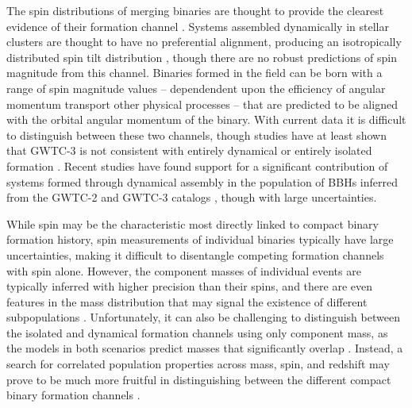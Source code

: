 The spin distributions of merging binaries are thought to provide the clearest evidence of their formation channel \citep{10.1088/1361-6382/aa552e, 10.1093/mnras/stx1764, 2017Natur.548..426F,2018ApJ...854L...9F}. Systems assembled dynamically in stellar clusters are thought to have no preferential alignment, producing an isotropically distributed spin tilt distribution \citep{1609.05916,10.1103/PhysRevD.100.043027}, though there are no robust predictions of spin magnitude from this channel. Binaries formed in the field can be born with a range of spin magnitude values -- dependendent upon the efficiency of angular momentum transport other physical processes -- that are predicted to be aligned with the orbital angular momentum of the binary. With current data it is difficult to distinguish between these two channels, though studies have at least shown that GWTC-3 is not consistent with entirely dynamical or entirely isolated formation \citep{2021arXiv211103634T,2022ApJ...937L..13C,2022arXiv220902206T,2022arXiv221012834E,10.3847/2041-8213/ac86c4,2011.09570}. Recent studies have found support for a significant contribution of systems formed through dynamical assembly in the population of BBHs inferred from the GWTC-2 and GWTC-3 catalogs \citep{2021ApJ...913L...7A,2021PhRvD.104h3010R,2021arXiv211103634T,2022ApJ...937L..13C,2021ApJ...921L..15G,2022arXiv220902206T,2022arXiv220906978V,2022arXiv221012834E}, though with large uncertainties.

While spin may be the characteristic most directly linked to compact binary formation history, spin measurements of individual binaries typically have large uncertainties, making it difficult to disentangle competing formation channels with spin alone. However, the component masses of individual events are typically inferred with higher precision than their spins, and there are even features in the mass distribution that may signal the existence of different subpopulations \citep{2021ApJ...913L..19T,2022ApJ...924..101E,2021arXiv211103634T,2022ApJ...928..155T,2022arXiv221012834E}. Unfortunately, it can also be challenging to distinguish between the isolated and dynamical formation channels using only component mass, as the models in both scenarios predict masses that significantly overlap \citep{1609.05916}. Instead, a search for correlated population properties across mass, spin, and redshift may prove to be much more fruitful in distinguishing between the different compact binary formation channels \citep{2021ApJ...912...98F,2021ApJ...922L...5C,2022ApJ...931...17V,2022ApJ...932L..19B}.

